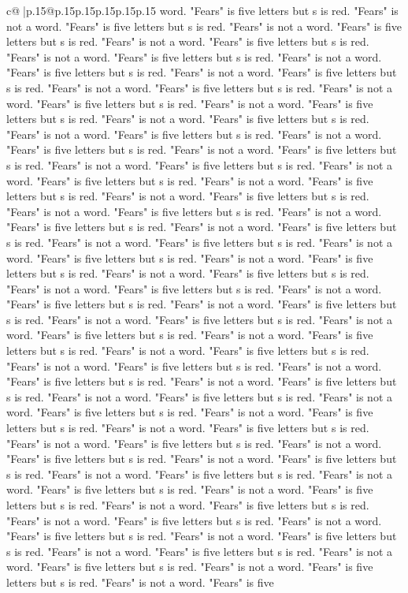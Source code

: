 \documentclass{article}
\begin{document}
{\begin{supertabular}{c@{$\;$}|p{.15\linewidth}@{}p{.15\linewidth}p{.15\linewidth}p{.15\linewidth}p{.15\linewidth}p{.15\linewidth}}
{{{word. "Fears" is five letters but s is red. "Fears" is not a word. "Fears" is five letters but s is red. "Fears" is not a word. "Fears" is five letters but s is red. "Fears" is not a word. "Fears" is five letters but s is red. "Fears" is not a word. "Fears" is five letters but s is red. "Fears" is not a word. "Fears" is five letters but s is red. "Fears" is not a word. "Fears" is five letters but s is red. "Fears" is not a word. "Fears" is five letters but s is red. "Fears" is not a word. "Fears" is five letters but s is red. "Fears" is not a word. "Fears" is five letters but s is red. "Fears" is not a word. "Fears" is five letters but s is red. "Fears" is not a word. "Fears" is five letters but s is red. "Fears" is not a word. "Fears" is five letters but s is red. "Fears" is not a word. "Fears" is five letters but s is red. "Fears" is not a word. "Fears" is five letters but s is red. "Fears" is not a word. "Fears" is five letters but s is red. "Fears" is not a word. "Fears" is five letters but s is red. "Fears" is not a word. "Fears" is five letters but s is red. "Fears" is not a word. "Fears" is five letters but s is red. "Fears" is not a word. "Fears" is five letters but s is red. "Fears" is not a word. "Fears" is five letters but s is red. "Fears" is not a word. "Fears" is five letters but s is red. "Fears" is not a word. "Fears" is five letters but s is red. "Fears" is not a word. "Fears" is five letters but s is red. "Fears" is not a word. "Fears" is five letters but s is red. "Fears" is not a word. "Fears" is five letters but s is red. "Fears" is not a word. "Fears" is five letters but s is red. "Fears" is not a word. "Fears" is five letters but s is red. "Fears" is not a word. "Fears" is five letters but s is red. "Fears" is not a word. "Fears" is five letters but s is red. "Fears" is not a word. "Fears" is five letters but s is red. "Fears" is not a word. "Fears" is five letters but s is red. "Fears" is not a word. "Fears" is five letters but s is red. "Fears" is not a word. "Fears" is five letters but s is red. "Fears" is not a word. "Fears" is five letters but s is red. "Fears" is not a word. "Fears" is five letters but s is red. "Fears" is not a word. "Fears" is five letters but s is red. "Fears" is not a word. "Fears" is five letters but s is red. "Fears" is not a word. "Fears" is five letters but s is red. "Fears" is not a word. "Fears" is five letters but s is red. "Fears" is not a word. "Fears" is five letters but s is red. "Fears" is not a word. "Fears" is five letters but s is red. "Fears" is not a word. "Fears" is five letters but s is red. "Fears" is not a word. "Fears" is five letters but s is red. "Fears" is not a word. "Fears" is five letters but s is red. "Fears" is not a word. "Fears" is five letters but s is red. "Fears" is not a word. "Fears" is five letters but s is red. "Fears" is not a word. "Fears" is five letters but s is red. "Fears" is not a word. "Fears" is five letters but s is red. "Fears" is not a word. "Fears" is five letters but s is red. "Fears" is not a word. "Fears" is five letters but s is red. "Fears" is not a word. "Fears" is five letters but s is red. "Fears" is not a word. "Fears" is five }}}
\end{supertabular}}
\end{document}
